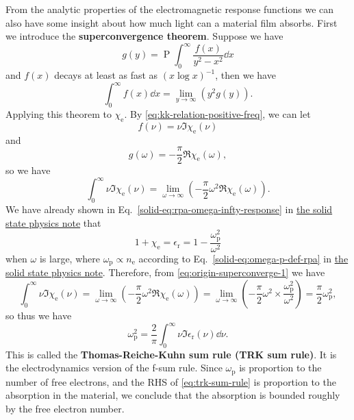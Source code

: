 \documentclass[hyperref, a4paper]{article}
\DeclareMathOperator{\primevalue}{P}
\newcommand*{\concept}[1]{{\textbf{#1}}}
\newcommand{\soliddoc}{\href{../solid/solid}{the solid state physics note}}
\begin{document}
From the analytic properties of the electromagnetic response functions we can also have some insight about how much light can a material film absorbs.
First we introduce the \concept{superconvergence theorem}. Suppose we have 
\begin{equation}
    g(y) = \primevalue \int_0^\infty \frac{f(x)}{y^2 - x^2} \dd{x}
\end{equation}
and $f(x)$ decays at least as fast as $(x \log x)^{-1}$, then we have
\begin{equation}
    \int_0^\infty f(x) \dd{x} = \lim_{y \to \infty} (y^2 g(y)).
\end{equation}
Applying this theorem to $\chi_\text{e}$. By \eqref{eq:kk-relation-positive-freq}, we can let 
\[
    f(\nu) = \nu \Im \chi_\text{e}(\nu)
\]
and 
\[
    g(\omega) = - \frac{\pi}{2} \Re \chi_\text{e}(\omega),
\]
so we have 
\begin{equation}
    \int_0^\infty \nu \Im \chi_\text{e}(\nu) = \lim_{\omega \to \infty} \left( - \frac{\pi}{2} \omega^2 \Re \chi_\text{e}(\omega) \right).
    \label{eq:origin-superconverge-1}
\end{equation}
We have already shown in Eq.~\eqref{solid-eq:rpa-omega-infty-response} in \soliddoc{} that 
\[
    1 + \chi_\text{e} = \epsilon_\text{r} = 1 - \frac{\omega_\text{p}^2}{\omega^2} 
\]
when $\omega$ is large, where $\omega_\text{p} \propto n_\text{e}$ according to Eq.~\eqref{solid-eq:omega-p-def-rpa} in \soliddoc. 
Therefore, from \eqref{eq:origin-superconverge-1} we have 
\[
    \int_0^\infty \nu \Im \chi_\text{e}(\nu) = \lim_{\omega \to \infty} \left( - \frac{\pi}{2} \omega^2 \Re \chi_\text{e}(\omega) \right) = \lim_{\omega \to \infty} \left( -\frac{\pi}{2} \omega^2 \times \frac{\omega_\text{p}^2}{\omega^2} \right) = \frac{\pi}{2} \omega_\text{p}^2,
\]
so thus we have 
\begin{equation}
    \omega_\text{p}^2 = \frac{2}{\pi} \int_0^\infty \nu \Im \epsilon_\text{r}(\nu) \dd{\nu}.
    \label{eq:trk-sum-rule}
\end{equation}
This is called the \concept{Thomas-Reiche-Kuhn sum rule (TRK sum rule)}.
It is the electrodynamics version of the f-sum rule.
Since $\omega_\text{p}$ is proportion to the number of free electrons, and the RHS of \eqref{eq:trk-sum-rule} is proportion to the absorption in the material, we conclude that the absorption is bounded roughly by the free electron number.
\end{document}
